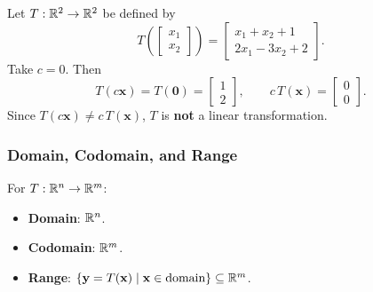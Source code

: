 \begin{example}
  Let $T: \mathbb{R}^2 \to \mathbb{R}^2$ be defined by
  \[
    T\!\left(
    \begin{bmatrix}
        x_1 \\ x_2
      \end{bmatrix}
    \right)
    =
    \begin{bmatrix}
      x_1 + x_2 + 1 \\ 2x_1 - 3x_2 + 2
    \end{bmatrix}
    .
  \]
  Take $c = 0$. Then
  \[
    T(c\mathbf{x}) = T(\mathbf{0}) =
    \begin{bmatrix}
      1 \\ 2
    \end{bmatrix}
    ,
    \qquad
    c\, T(\mathbf{x}) =
    \begin{bmatrix}
      0 \\ 0
    \end{bmatrix}
    .
  \]
  Since $T(c\mathbf{x}) \neq c\, T(\mathbf{x})$, $T$ is \textbf{not} a linear transformation.
\end{example}

\subsubsection{Domain, Codomain, and Range}

For $T: \mathbb{R}^n \to \mathbb{R}^m$:
\begin{itemize}
  \item \textbf{Domain}: $\mathbb{R}^n$.
  \item \textbf{Codomain}: $\mathbb{R}^m$.
  \item \textbf{Range}: $\{\mathbf{y} = T(\mathbf{x}) \mid \mathbf{x} \in \text{domain}\} \subseteq \mathbb{R}^m$.
\end{itemize}

